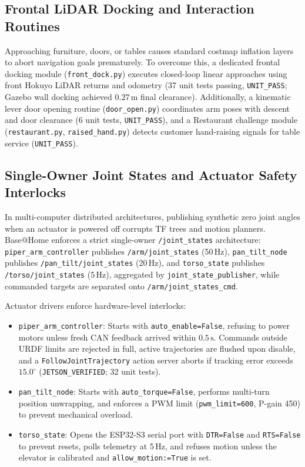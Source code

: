 \documentclass[runningheads,a4paper]{llncs}
\begin{document}
\subsection{Frontal LiDAR Docking and Interaction Routines}
Approaching furniture, doors, or tables causes standard costmap inflation layers to abort navigation goals prematurely. To overcome this, a dedicated frontal docking module (\texttt{front\_dock.py}) executes closed-loop linear approaches using front Hokuyo LiDAR returns and odometry (37 unit tests passing, \texttt{UNIT\_PASS}; Gazebo wall docking achieved $0.27\,\text{m}$ final clearance). Additionally, a kinematic lever door opening routine (\texttt{door\_open.py}) coordinates arm poses with descent and door clearance (6 unit tests, \texttt{UNIT\_PASS}), and a Restaurant challenge module (\texttt{restaurant.py}, \texttt{raised\_hand.py}) detects customer hand-raising signals for table service (\texttt{UNIT\_PASS}).

\subsection{Single-Owner Joint States and Actuator Safety Interlocks}
In multi-computer distributed architectures, publishing synthetic zero joint angles when an actuator is powered off corrupts TF trees and motion planners. Base@Home enforces a strict single-owner \texttt{/joint\_states} architecture: \texttt{piper\_arm\_controller} publishes \texttt{/arm/joint\_states} (50\,Hz), \texttt{pan\_tilt\_node} publishes \texttt{/pan\_tilt/joint\_states} (20\,Hz), and \texttt{torso\_state} publishes \texttt{/torso/joint\_states} (5\,Hz), aggregated by \texttt{joint\_state\_publisher}, while commanded targets are separated onto \texttt{/arm/joint\_states\_cmd}.

Actuator drivers enforce hardware-level interlocks:
\begin{itemize}
    \item \texttt{piper\_arm\_controller}: Starts with \texttt{auto\_enable=False}, refusing to power motors unless fresh CAN feedback arrived within $0.5\,\text{s}$. Commands outside URDF limits are rejected in full, active trajectories are flushed upon disable, and a \texttt{FollowJointTrajectory} action server aborts if tracking error exceeds $15.0^\circ$ (\texttt{JETSON\_VERIFIED}; 32 unit tests).
    \item \texttt{pan\_tilt\_node}: Starts with \texttt{auto\_torque=False}, performs multi-turn position unwrapping, and enforces a PWM limit (\texttt{pwm\_limit=600}, P-gain 450) to prevent mechanical overload.
    \item \texttt{torso\_state}: Opens the ESP32-S3 serial port with \texttt{DTR=False} and \texttt{RTS=False} to prevent resets, polls telemetry at 5\,Hz, and refuses motion unless the elevator is calibrated and \texttt{allow\_motion:=True} is set.
\end{itemize}
\end{document}
